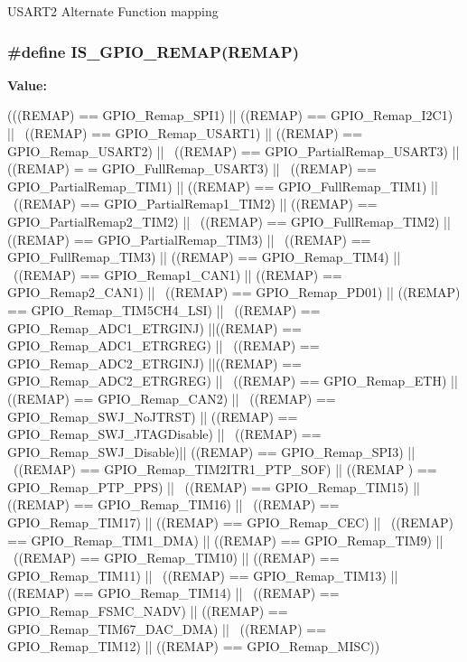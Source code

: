 \label{group__GPIO__Remap__define_gaeb2ebb12e23138509af20dce1fc6c246}
USART2 Alternate Function mapping \hypertarget{group__GPIO__Remap__define_gaccf4664689f281fd4ee91ef16c9dc985}{
\subsubsection[{IS\_\-GPIO\_\-REMAP}]{\setlength{\rightskip}{0pt plus 5cm}\#define IS\_\-GPIO\_\-REMAP(REMAP)}}
\label{group__GPIO__Remap__define_gaccf4664689f281fd4ee91ef16c9dc985}
{\bfseries Value:}
\begin{DoxyCode}
(((REMAP) == GPIO_Remap_SPI1) || ((REMAP) == GPIO_Remap_I2C1) || \
                              ((REMAP) == GPIO_Remap_USART1) || ((REMAP) == 
      GPIO_Remap_USART2) || \
                              ((REMAP) == GPIO_PartialRemap_USART3) || ((REMAP) =
      = GPIO_FullRemap_USART3) || \
                              ((REMAP) == GPIO_PartialRemap_TIM1) || ((REMAP) == 
      GPIO_FullRemap_TIM1) || \
                              ((REMAP) == GPIO_PartialRemap1_TIM2) || ((REMAP) ==
       GPIO_PartialRemap2_TIM2) || \
                              ((REMAP) == GPIO_FullRemap_TIM2) || ((REMAP) == 
      GPIO_PartialRemap_TIM3) || \
                              ((REMAP) == GPIO_FullRemap_TIM3) || ((REMAP) == 
      GPIO_Remap_TIM4) || \
                              ((REMAP) == GPIO_Remap1_CAN1) || ((REMAP) == 
      GPIO_Remap2_CAN1) || \
                              ((REMAP) == GPIO_Remap_PD01) || ((REMAP) == 
      GPIO_Remap_TIM5CH4_LSI) || \
                              ((REMAP) == GPIO_Remap_ADC1_ETRGINJ) ||((REMAP) == 
      GPIO_Remap_ADC1_ETRGREG) || \
                              ((REMAP) == GPIO_Remap_ADC2_ETRGINJ) ||((REMAP) == 
      GPIO_Remap_ADC2_ETRGREG) || \
                              ((REMAP) == GPIO_Remap_ETH) ||((REMAP) == 
      GPIO_Remap_CAN2) || \
                              ((REMAP) == GPIO_Remap_SWJ_NoJTRST) || ((REMAP) == 
      GPIO_Remap_SWJ_JTAGDisable) || \
                              ((REMAP) == GPIO_Remap_SWJ_Disable)|| ((REMAP) == 
      GPIO_Remap_SPI3) || \
                              ((REMAP) == GPIO_Remap_TIM2ITR1_PTP_SOF) || ((REMAP
      ) == GPIO_Remap_PTP_PPS) || \
                              ((REMAP) == GPIO_Remap_TIM15) || ((REMAP) == 
      GPIO_Remap_TIM16) || \
                              ((REMAP) == GPIO_Remap_TIM17) || ((REMAP) == 
      GPIO_Remap_CEC) || \
                              ((REMAP) == GPIO_Remap_TIM1_DMA) || ((REMAP) == 
      GPIO_Remap_TIM9) || \
                              ((REMAP) == GPIO_Remap_TIM10) || ((REMAP) == 
      GPIO_Remap_TIM11) || \
                              ((REMAP) == GPIO_Remap_TIM13) || ((REMAP) == 
      GPIO_Remap_TIM14) || \
                              ((REMAP) == GPIO_Remap_FSMC_NADV) || ((REMAP) == 
      GPIO_Remap_TIM67_DAC_DMA) || \
                              ((REMAP) == GPIO_Remap_TIM12) || ((REMAP) == 
      GPIO_Remap_MISC))
\end{DoxyCode}
